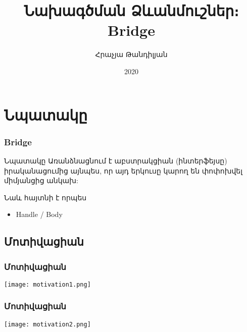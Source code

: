 \documentclass{beamer}
\begin{document}
\title[Bridge]{Նախագծման Ձևանմուշներ։ Bridge}
\author[Հրաչյա Թանդիլյան\copyright]{Հրաչյա Թանդիլյան}
\date{2020}

\begin{frame}
\titlepage
\end{frame}

\section{Նպատակը}
\begin{frame}\frametitle{Bridge}
\begin{block}{Նպատակը}
    Առանձնացնում է աբստրակցիան (ինտերֆեյսը) իրականացումից այնպես,
    որ այդ երկուսը կարող են փոփոխվել միմյանցից անկախ:
\end{block}
\vfill
Նաև հայտնի է որպես
\begin{itemize}
    \item Handle / Body
\end{itemize}
\end{frame}

\subsection{Մոտիվացիան}
\begin{frame}\frametitle{Մոտիվացիան}
\begin{center}
    \texttt{[image: motivation1.png]}
\end{center}
\end{frame}

\begin{frame}\frametitle{Մոտիվացիան}
\begin{center}
    \texttt{[image: motivation2.png]}
\end{center}
\end{frame}
\end{document}
